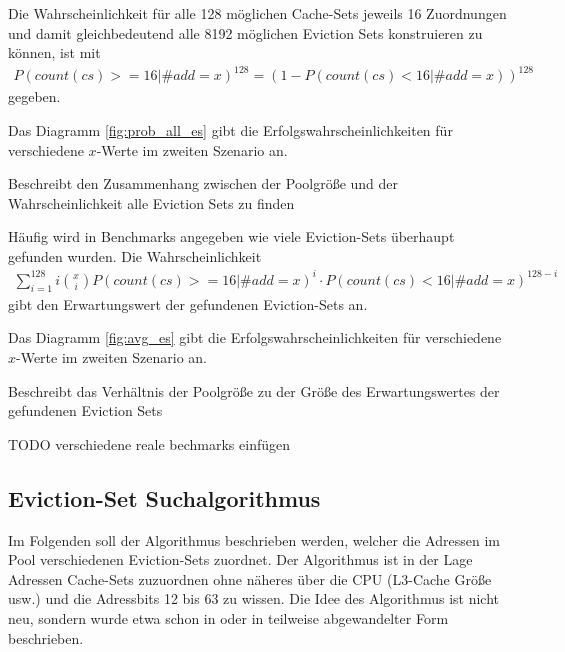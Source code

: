 Die Wahrscheinlichkeit für alle 128 möglichen Cache-Sets jeweils 16 Zuordnungen und damit gleichbedeutend alle 8192 möglichen Eviction Sets konstruieren zu können, ist mit 
\begin{align*}
P(count(cs)>=16|\#add = x)^{128} = (1-P(count(cs)<16|\#add = x))^{128}
\end{align*}
gegeben.  

Das Diagramm \ref{fig:prob_all_es} gibt die Erfolgswahrscheinlichkeiten für verschiedene $x$-Werte im zweiten Szenario an.
\label{fig:prob_all_es}
\begin{center}
\begin{scaletikzpicturetowidth}{\textwidth}

\caption{Beschreibt den Zusammenhang zwischen der Poolgröße und der Wahrscheinlichkeit alle Eviction Sets zu finden}
\end{scaletikzpicturetowidth}
\end{center}
Häufig wird in Benchmarks angegeben wie viele Eviction-Sets überhaupt gefunden wurden. Die Wahrscheinlichkeit 
\begin{align*}
\sum\limits_{i=1}^{128} i {x \choose i} P(count(cs)>=16|\#add = x)^i \cdot P(count(cs)<16|\#add = x)^{128-i} 
\end{align*}
gibt den Erwartungswert der gefundenen Eviction-Sets an.

Das Diagramm \ref{fig:avg_es} gibt die Erfolgswahrscheinlichkeiten für verschiedene $x$-Werte im zweiten Szenario an.
\label{fig:avg_es}
\begin{center}
\begin{scaletikzpicturetowidth}{\textwidth}

\caption{Beschreibt das Verhältnis der Poolgröße zu der Größe des Erwartungswertes der gefundenen Eviction Sets}
\end{scaletikzpicturetowidth}
\end{center}

TODO verschiedene reale bechmarks einfügen

\subsection{Eviction-Set Suchalgorithmus}

Im Folgenden soll der Algorithmus beschrieben werden, welcher die Adressen im Pool verschiedenen Eviction-Sets zuordnet.
Der Algorithmus ist in der Lage Adressen Cache-Sets zuzuordnen ohne näheres über die CPU (L3-Cache Größe usw.) und die Adressbits 12 bis 63 zu wissen.
Die Idee des Algorithmus ist nicht neu, sondern wurde etwa schon in \cite{} oder \cite{} in teilweise abgewandelter Form beschrieben.

